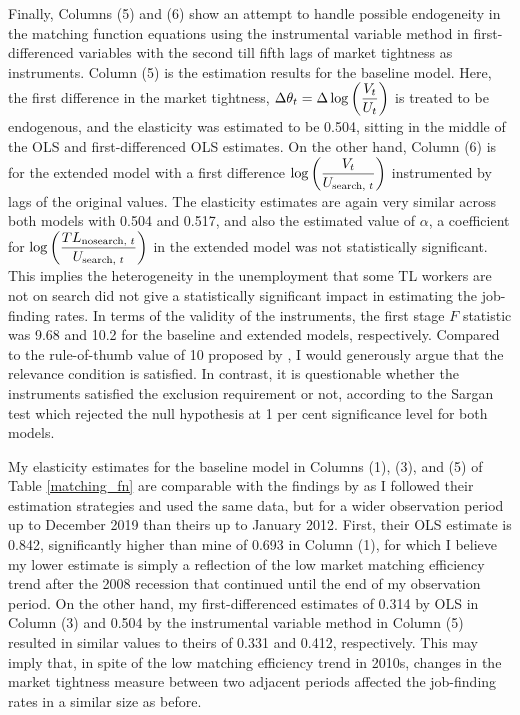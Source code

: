 \documentclass[a4paper, 11pt, tikz]{article}
\begin{document}
Finally, Columns (5) and (6) show an attempt to handle possible endogeneity in the matching function equations using the instrumental variable method in first-differenced variables with the second till fifth lags of market tightness as instruments.
Column (5) is the estimation results for the baseline model.
Here, the first difference in the market tightness, $\Delta\theta_t = \Delta\log\qty(\dfrac{V_t}{U_t})$ is treated to be endogenous, and the elasticity was estimated to be 0.504, sitting in the middle of the OLS and first-differenced OLS estimates.
On the other hand, Column (6) is for the extended model with a first difference $\log\qty(\dfrac{V_t}{U_{\text{search, }t}})$ instrumented by lags of the original values.
The elasticity estimates are again very similar across both models with 0.504 and 0.517, and also the estimated value of $\alpha$, a coefficient for $\log\qty(\dfrac{TL_{\text{nosearch, }t}}{U_{\text{search, }t}})$ in the extended model was not statistically significant.
This implies the heterogeneity in the unemployment that some TL workers are not on search did not give a statistically significant impact in estimating the job-finding rates.
In terms of the validity of the instruments, the first stage $F$ statistic was 9.68 and 10.2 for the baseline and extended models, respectively.
Compared to the rule-of-thumb value of 10 proposed by \cite{staiger1997instrumental}, I would generously argue that the relevance condition is satisfied.
In contrast, it is questionable whether the instruments satisfied the exclusion requirement or not, according to the Sargan test which rejected the null hypothesis at 1 per cent significance level for both models.

My elasticity estimates for the baseline model in Columns (1), (3), and (5) of Table \ref{matching_fn} are comparable with the findings by \cite{borowczyk-martins2013accounting} as I followed their estimation strategies and used the same data, but for a wider observation period up to December 2019 than theirs up to January 2012.
First, their OLS estimate is 0.842, significantly higher than mine of 0.693 in Column (1), for which I believe my lower estimate is simply a reflection of the low market matching efficiency trend after the 2008 recession that continued until the end of my observation period.
On the other hand, my first-differenced estimates of 0.314 by OLS in Column (3) and 0.504 by the instrumental variable method in Column (5) resulted in similar values to theirs of 0.331 and 0.412, respectively.
This may imply that, in spite of the low matching efficiency trend in 2010s, changes in the market tightness measure between two adjacent periods affected the job-finding rates in a similar size as before.
\end{document}
